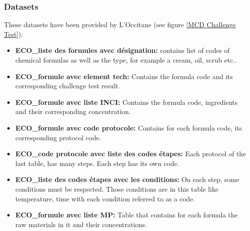 \documentclass[a4paper,12pt,twoside]{report}
\begin{document}
\subsubsection{Datasets}
These datasets have been provided by L'Occitane (see figure \ref{MCD Challenge Test}):
\begin{itemize}
\item \textbf{ECO\_liste des formules avec désignation:} contains list of codes of chemical formulas as well as the type, for example a cream, oil, scrub etc..
\item \textbf{ECO\_formule avec element tech:} Contains the formula code and its corresponding challenge test result.
\item \textbf{ECO\_formule avec liste INCI:} Contains the formula code, ingredients and their corresponding concentration.
\item \textbf{ECO\_formule avec code protocole:} Contains for each formula code, its corresponding protocol code. 
\item \textbf{ECO\_code protocole avec liste des codes étapes:} Each protocol of the last table, has many steps. Each step has its own code.
\item \textbf{ECO\_liste des codes étapes avec les conditions:} On each step, some conditions must be respected. Those conditions are in this table like temperature, time with each condition referred to as a code.
\item \textbf{ECO\_formule avec liste MP:} Table that contains for each formula the raw materials in it and their concentrations.
\end{itemize}
\end{document}
